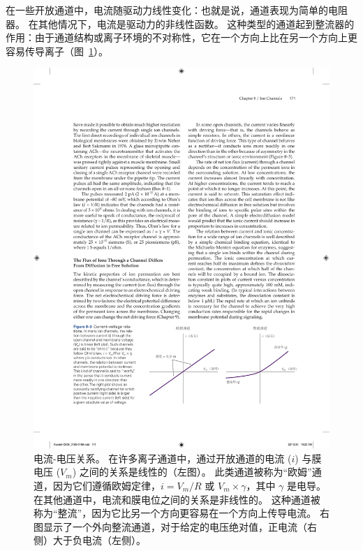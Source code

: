 在一些开放通道中，电流随驱动力线性变化：也就是说，通道表现为简单的电阻器。
在其他情况下，电流是驱动力的非线性函数。
这种类型的通道起到整流器的作用：由于通道结构或离子环境的不对称性，它在一个方向上比在另一个方向上更容易传导离子（图~\ref{fig:8_3}）。


\begin{figure}[htbp]
	\centering
	\includegraphics[width=1.0\linewidth]{chap08/fig_8_3}
	\caption{电流-电压关系。
		在许多离子通道中，通过开放通道的电流 ($i$) 与膜电压 ($V_m$) 之间的关系是线性的（左图）。
		此类通道被称为“欧姆”通道，因为它们遵循欧姆定律，$i = V_m /R$ 或 $ V_m \times \gamma $，其中 $\gamma$ 是电导。
		在其他通道中，电流和膜电位之间的关系是非线性的。
		这种通道被称为“整流”，因为它比另一个方向更容易在一个方向上传导电流。
		右图显示了一个外向整流通道，对于给定的电压绝对值，正电流（右侧）大于负电流（左侧）。}
	\label{fig:8_3}
\end{figure}


